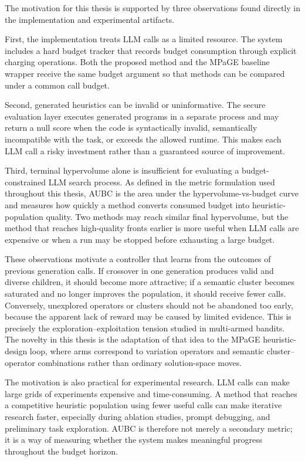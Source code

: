 \documentclass[../main.tex]{subfiles}
\begin{document}
The motivation for this thesis is supported by three observations found directly in the implementation and experimental artifacts.

First, the implementation treats LLM calls as a limited resource. The system includes a hard budget tracker that records budget consumption through explicit charging operations. Both the proposed method and the MPaGE baseline wrapper receive the same budget argument so that methods can be compared under a common call budget.

Second, generated heuristics can be invalid or uninformative. The secure evaluation layer executes generated programs in a separate process and may return a null score when the code is syntactically invalid, semantically incompatible with the task, or exceeds the allowed runtime. This makes each LLM call a risky investment rather than a guaranteed source of improvement.

Third, terminal hypervolume alone is insufficient for evaluating a budget-constrained LLM search process. As defined in the metric formulation used throughout this thesis, AUBC is the area under the hypervolume-vs-budget curve and measures how quickly a method converts consumed budget into heuristic-population quality. Two methods may reach similar final hypervolume, but the method that reaches high-quality fronts earlier is more useful when LLM calls are expensive or when a run may be stopped before exhausting a large budget.

These observations motivate a controller that learns from the outcomes of previous generation calls. If crossover in one generation produces valid and diverse children, it should become more attractive; if a semantic cluster becomes saturated and no longer improves the population, it should receive fewer calls. Conversely, unexplored operators or clusters should not be abandoned too early, because the apparent lack of reward may be caused by limited evidence. This is precisely the exploration--exploitation tension studied in multi-armed bandits. The novelty in this thesis is the adaptation of that idea to the MPaGE heuristic-design loop, where arms correspond to variation operators and semantic cluster--operator combinations rather than ordinary solution-space moves.

The motivation is also practical for experimental research. LLM calls can make large grids of experiments expensive and time-consuming. A method that reaches a competitive heuristic population using fewer useful calls can make iterative research faster, especially during ablation studies, prompt debugging, and preliminary task exploration. AUBC is therefore not merely a secondary metric; it is a way of measuring whether the system makes meaningful progress throughout the budget horizon.
\end{document}
